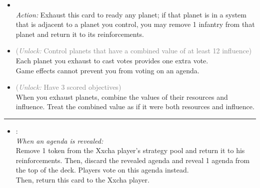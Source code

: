 \begin{multicols}{2}
\begin{itemize}
\item {}\\
\emph{Action:}
Exhaust this card to ready any planet; if that planet is in a system that is adjacent to a planet you control, you may remove 1 infantry from that planet and return it to its reinforcements. 
\item {} \textcolor{gray}{(\emph{Unlock:} Control planets that have a combined value of at least 12 influence)}\\
Each planet you exhaust to cast votes provides one extra vote.\\
Game effects cannot prevent you from voting on an agenda.
\item {} \textcolor{gray}{(\emph{Unlock:} Have 3 scored objectives)}\\
When you exhaust planets, combine the values of their resources and influence. Treat the combined value as if it were both resources and influence.
\end{itemize}

\vspace{-10pt}\rule{\hsize}{0.4pt}\vspace{5pt}


\begin{itemize}
\item {}:\\
\emph{When an agenda is revealed:}\\
Remove 1 token from the Xxcha player's strategy pool and return it to his reinforcements. Then, discard the revealed agenda and reveal 1 agenda from the top of the deck. Players vote on this agenda instead.\\
Then, return this card to the Xxcha player.
\end{itemize}

\end{multicols}




